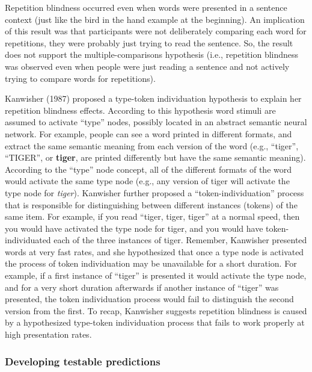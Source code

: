 \documentclass[
  man,floatsintext]{apa6}
\begin{document}
Repetition blindness occurred even when words were presented in a sentence context (just like the bird in the hand example at the beginning). An implication of this result was that participants were not deliberately comparing each word for repetitions, they were probably just trying to read the sentence. So, the result does not support the multiple-comparisons hypothesis (i.e., repetition blindness was observed even when people were just reading a sentence and not actively trying to compare words for repetitions).

Kanwisher (1987) proposed a type-token individuation hypothesis to explain her repetition blindness effects. According to this hypothesis word stimuli are assumed to activate ``type'' nodes, possibly located in an abstract semantic neural network. For example, people can see a word printed in different formats, and extract the same semantic meaning from each version of the word (e.g., ``tiger'', ``TIGER'', or \textbf{tiger}, are printed differently but have the same semantic meaning). According to the ``type'' node concept, all of the different formats of the word would activate the same type node (e.g., any version of tiger will activate the type node for \emph{tiger}). Kanwisher further proposed a ``token-individuation'' process that is responsible for distinguishing between different instances (tokens) of the same item. For example, if you read ``tiger, tiger, tiger'' at a normal speed, then you would have activated the type node for tiger, and you would have token-individuated each of the three instances of tiger. Remember, Kanwisher presented words at very fast rates, and she hypothesized that once a type node is activated the process of token individuation may be unavailable for a short duration. For example, if a first instance of ``tiger'' is presented it would activate the type node, and for a very short duration afterwards if another instance of ``tiger'' was presented, the token individuation process would fail to distinguish the second version from the first. To recap, Kanwisher suggests repetition blindness is caused by a hypothesized type-token individuation process that fails to work properly at high presentation rates.

\hypertarget{developing-testable-predictions}{%
\subsubsection{Developing testable predictions}\label{developing-testable-predictions}}
\end{document}
